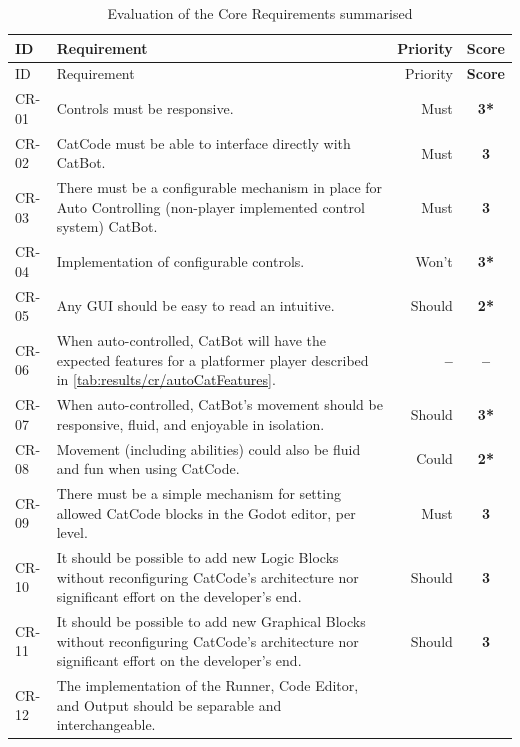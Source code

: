 \begin{center}
  \begin{longtable}{lp{9.6cm}rc}
    \caption{Evaluation of the Core Requirements summarised} \label{tab:results/cr/general} \\
    \toprule
    ID
    & Requirement
    & Priority
    & \textbf{Score}\\ \midrule
    \endfirsthead
    \toprule
    ID
    & Requirement
    & Priority
    & \textbf{Score}\\ \midrule
    \endhead
    CR-01
    & Controls must be responsive.
    & Must
    & \textbf{3*}
    \\
    CR-02
    & CatCode must be able to interface directly with CatBot.
    & Must
    & \textbf{3}
    \\ 
    CR-03
    & There must be a configurable mechanism in place for Auto Controlling (non-player implemented control system) CatBot.
    & Must
    & \textbf{3}
    \\
    CR-04
    & Implementation of configurable controls.
    & Won't
    & \textbf{3*}
    \\ 
    CR-05
    & Any GUI should be easy to read an intuitive.
    & Should
    & \textbf{2*}
    \\
    CR-06
    & When auto-controlled, CatBot will have the expected features for a platformer player described in \autoref{tab:results/cr/autoCatFeatures}.
    & \textbf{--}
    & \textbf{--}
    \\
    CR-07
    & When auto-controlled, CatBot's movement should be responsive, fluid, and enjoyable in isolation.
    & Should
    & \textbf{3*}
    \\
    CR-08
    & Movement (including abilities) could also be fluid and fun when using CatCode.
    & Could
    & \textbf{2*}
    \\
    CR-09
    & There must be a simple mechanism for setting allowed CatCode blocks in the Godot editor, per level.
    & Must
    & \textbf{3}
    \\
    CR-10
    & It should be possible to add new Logic Blocks without reconfiguring CatCode's architecture nor significant effort on the developer's end. 
    & Should
    & \textbf{3}
    \\
    CR-11
    & It should be possible to add new Graphical Blocks without reconfiguring CatCode's architecture nor significant effort on the developer's end. 
    & Should
    & \textbf{3}
    \\
    CR-12
    & The implementation of the Runner, Code Editor, and Output should be separable and interchangeable.

\end{longtable}
\end{center}
